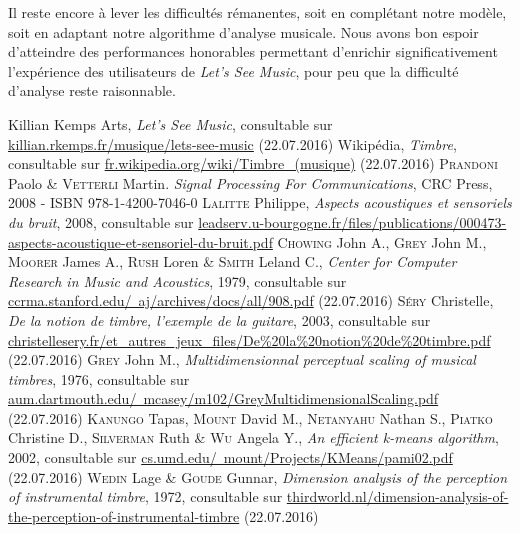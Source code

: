 \documentclass[10pt]{article}
\begin{document}
\begin{multicols}{2}
Il reste encore à lever les difficultés rémanentes, soit en complétant notre modèle, soit en adaptant notre algorithme d'analyse musicale.
Nous avons bon espoir d'atteindre des performances honorables permettant d'enrichir significativement l'expérience des utilisateurs de \emph{Let's See Music}, pour peu que la difficulté d'analyse reste raisonnable.




\begin{thebibliography}{9}
    Killian Kemps Arts, \emph{Let's See Music}, consultable sur \href{http://killian.rkemps.fr/musique/lets-see-music}{killian.rkemps.fr/musique/lets-see-music} (22.07.2016)
    Wikipédia, \emph{Timbre}, consultable sur \href{https://fr.wikipedia.org/wiki/Timbre\_(musique)}{fr.wikipedia.org/wiki/Timbre\_(musique)} (22.07.2016)
    \textsc{Prandoni} Paolo \& \textsc{Vetterli} Martin. \emph{Signal Processing For Communications}, CRC Press, 2008 - ISBN 978-1-4200-7046-0
    \textsc{Lalitte} Philippe, \emph{Aspects acoustiques et sensoriels du bruit}, 2008, consultable sur \href{http://leadserv.u-bourgogne.fr/files/publications/000473-aspects-acoustique-et-sensoriel-du-bruit.pdf}{leadserv.u-bourgogne.fr/files/publications/000473-aspects-acoustique-et-sensoriel-du-bruit.pdf}
    \textsc{Chowing} John A., \textsc{Grey} John M., \textsc{Moorer} James A., \textsc{Rush} Loren \& \textsc{Smith} Leland C., \emph{Center for Computer Research in Music and Acoustics}, 1979, consultable sur \href{https://ccrma.stanford.edu/~aj/archives/docs/all/908.pdf}{ccrma.stanford.edu/~aj/archives/docs/all/908.pdf} (22.07.2016)
    \textsc{Séry} Christelle, \emph{De la notion de timbre, l'exemple de la guitare}, 2003, consultable sur \href{http://www.christellesery.fr/et\_autres\_jeux\_files/De\%20la\%20notion\%20de\%20timbre.pdf}{christellesery.fr/et\_autres\_jeux\_files/De\%20la\%20no\-tion\%20de\%20timbre.pdf} (22.07.2016)
    \textsc{Grey} John M., \emph{Multidimensionnal perceptual scaling of musical timbres}, 1976, consultable sur \href{http://aum.dartmouth.edu/~mcasey/m102/GreyMultidimensionalScaling.pdf}{aum.dartmouth.edu/~mcasey/m102/GreyMultidimen\-sionalScaling.pdf} (22.07.2016)
    \textsc{Kanungo} Tapas, \textsc{Mount} David M., \textsc{Netanyahu} Nathan S., \textsc{Piatko} Christine D., \textsc{Silverman} Ruth \& \textsc{Wu} Angela Y., \emph{An efficient k-means algorithm}, 2002, consultable sur \href{https://www.cs.umd.edu/~mount/Projects/KMeans/pami02.pdf}{cs.umd.edu/~mount/Projects/KMeans/pami02.pdf} (22.07.2016)
    \textsc{Wedin} Lage \& \textsc{Goude} Gunnar, \emph{Dimension analysis of the perception of instrumental timbre}, 1972, consultable sur \href{http://thirdworld.nl/dimension-analysis-of-the-perception-of-instrumental-timbre}{thirdworld.nl/dimension-analysis-of-the-perception-of-instrumental-timbre} (22.07.2016)
\end{thebibliography}



\end{multicols}
\end{document}
